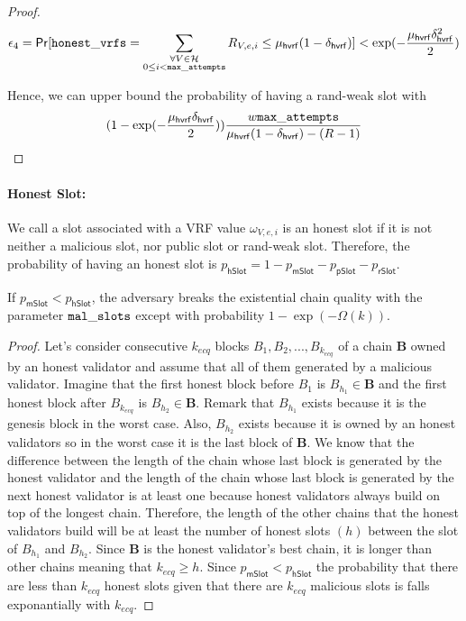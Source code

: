 \begin{proof}
	\begin{equation}\label{eq:beforeepcoh}
	\epsilon_4 = \mathsf{Pr}[ \mathtt{honest\_vrfs} = \sum_{\substack{ \forall V \in \mathcal{H} \\0\leq i < \mathtt{max\_attempts}}} R_{V,e,i} \leq \mu_{\mathsf{hvrf}} (1 - \delta_{\mathsf{hvrf}})] < \exp(-\frac{\mu_{\mathsf{hvrf}}\delta_{\mathsf{hvrf}}^2}{2}) \nonumber
	\end{equation}
	
	Hence, we can upper bound the probability of having a rand-weak slot with
	$$(1 - \exp(-\frac{\mu_{\mathsf{hvrf}}\delta_{\mathsf{hvrf}}}{2}))\frac{w \mathtt{max\_attempts} }{\mu_{\mathsf{hvrf}} (1- \delta_{\mathsf{hvrf}}) - (R  -1)} $$
\end{proof}

\paragraph{Honest Slot:} We call a slot associated with a VRF value $ \omega_{V,e,i} $ is an honest slot  if it is not neither a malicious slot, nor public slot or rand-weak slot. Therefore, the probability of having an honest slot is $ p_{\mathsf{hSlot}} = 1- p_{\mathsf{mSlot}} - p_{\mathsf{pSlot}} - p_{\mathsf{rSlot}}  $.  


\begin{lemma}[ECQ]
	If $ p_{\mathsf{mSlot}} < p_{\mathsf{hSlot}} $, the adversary breaks the existential chain quality with the parameter $ \mathtt{mal\_slots} $ except with probability $ 1- \exp(-\Omega(k)) $.
\end{lemma}

\begin{proof}
	
	Let's consider consecutive $ k_{ecq} $ blocks $ B_1, B_2, ..., B_{k_{ecq}} $ of a chain $ \mathbf{B} $ owned by an honest validator  and assume that all of them generated by a malicious validator. Imagine that the first honest block before $ B_1 $ is $ B_{h_1}  \in \mathbf{B}$  and the first honest block after $ B_{k_{ecq}} $ is $ B_{h_2}  \in \mathbf{B}$. Remark that $ B_{h_1} $ exists because it is the genesis block in the worst case. Also, $ B_{h_2} $ exists because it is owned by an honest validators so in the worst case it is the last block of $ \mathbf{B} $. We know that the difference between the length of the chain whose last block is generated by the honest validator and the length of the chain whose last block is generated by the next honest validator is at least one because honest validators always build on top of the longest chain. Therefore, the length of the other chains that the honest validators build will be at least the number of honest slots $ (h) $ between the slot of $ B_{h_1} $ and $ B_{h_2} $. Since $ \mathbf{B} $ is the honest validator's best chain, it is longer than other chains meaning that $ k_{ecq} \geq h $.  Since $ p_{\mathsf{mSlot}} < p_{\mathsf{hSlot}} $ the probability that there are less than $ k_{ecq} $ honest slots given that there are $ k_{ecq} $ malicious slots is  falls exponantially with $ k_{ecq} $.
\end{proof}


